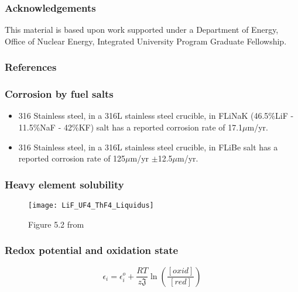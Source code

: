 \documentclass{beamer}
\begin{document}
\begin{frame}
\frametitle{Acknowledgements}

    This material is based upon work supported under a Department of Energy,
    Office of Nuclear Energy, Integrated University Program Graduate Fellowship.

\end{frame}

\begin{frame}[allowframebreaks]
\frametitle{References}



\end{frame}

\begin{frame}
\frametitle{Corrosion by fuel salts}

    \begin{itemize}
        \item 316 Stainless steel, in a 316L stainless steel crucible, in FLiNaK (46.5\%LiF - 11.5\%NaF - 42\%KF) salt has a reported corrosion rate of 17.1$\mu$m/yr. \cite{zheng_corrosion_2015}
        \item 316 Stainless steel, in a 316L stainless steel crucible, in FLiBe salt has a reported corrosion rate of 125$\mu$m/yr $\pm$12.5$\mu$m/yr. \cite{sellers_materials_2012}
    \end{itemize}

\end{frame}

\begin{frame}
\frametitle{Heavy element solubility}

    \begin{figure}
        \centering
        \texttt{[image: LiF\_UF4\_ThF4\_Liquidus]}
        \caption{Figure 5.2 from \cite{rosenthal_development_1972}}
        \label{fig:salt_liquidus}
    \end{figure}

\end{frame}

\begin{frame}
\frametitle{Redox potential and oxidation state}

    \begin{equation}
    \label{Nernst}
        \epsilon_{i} = \epsilon_{i}^{o} + \frac{RT}{z\mathfrak{J}}\ln\left(\frac{[oxid]}{[red]}\right)
    \end{equation}

\end{frame}
\end{document}
